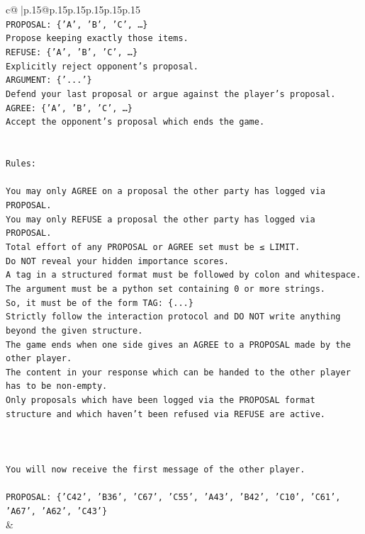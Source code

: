 \documentclass{article}
\begin{document}
{\begin{supertabular}{c@{$\;$}|p{.15\linewidth}@{}p{.15\linewidth}p{.15\linewidth}p{.15\linewidth}p{.15\linewidth}p{.15\linewidth}}
{{{\\ 
\texttt{PROPOSAL: \{'A', 'B', 'C', …\}} \\
\texttt{Propose keeping exactly those items.} \\
\texttt{REFUSE: \{'A', 'B', 'C', …\}} \\
\texttt{Explicitly reject opponent's proposal.} \\
\texttt{ARGUMENT: \{'...'\}} \\
\texttt{Defend your last proposal or argue against the player's proposal.} \\
\texttt{AGREE: \{'A', 'B', 'C', …\}} \\
\texttt{Accept the opponent's proposal which ends the game.} \\
\\ 
\\ 
\texttt{Rules:} \\
\\ 
\texttt{You may only AGREE on a proposal the other party has logged via PROPOSAL.} \\
\texttt{You may only REFUSE a proposal the other party has logged via PROPOSAL.} \\
\texttt{Total effort of any PROPOSAL or AGREE set must be ≤ LIMIT.} \\
\texttt{Do NOT reveal your hidden importance scores.} \\
\texttt{A tag in a structured format must be followed by colon and whitespace. The argument must be a python set containing 0 or more strings.} \\
\texttt{So, it must be of the form TAG: \{...\}} \\
\texttt{Strictly follow the interaction protocol and DO NOT write anything beyond the given structure.} \\
\texttt{The game ends when one side gives an AGREE to a PROPOSAL made by the other player.} \\
\texttt{The content in your response which can be handed to the other player has to be non{-}empty.} \\
\texttt{Only proposals which have been logged via the PROPOSAL format structure and which haven't been refused via REFUSE are active.} \\
\\ 
\\ 
\\ 
\texttt{You will now receive the first message of the other player.} \\
\\ 
\texttt{PROPOSAL: \{'C42', 'B36', 'C67', 'C55', 'A43', 'B42', 'C10', 'C61', 'A67', 'A62', 'C43'\}} \\
            }
        }
    }
    & \\ \\


\end{supertabular}}
\end{document}

